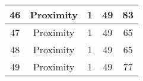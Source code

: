 \documentclass[results.tex]{subfiles}
\begin{document}
\begin{center}
\begin{tabular}{| c || c | c | c | c |}
            \hline
            46                      & Proximity                    & 1                      & 49                      & 83                   \\
            \hline
            47                      & Proximity                    & 1                      & 49                      & 65                   \\
            \hline
            48                      & Proximity                    & 1                      & 49                      & 65                   \\
            \hline
            49                      & Proximity                    & 1                      & 49                      & 77                   \\
            \hline
        \end{tabular}
    \end{center}
\end{document}

